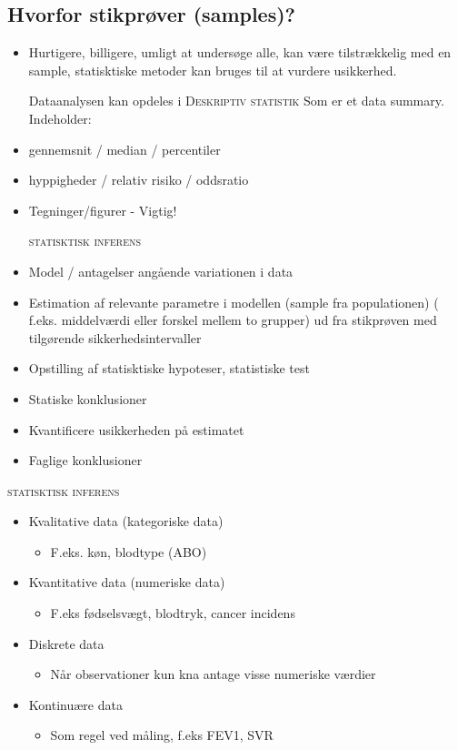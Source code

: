 \documentclass[12pt, letterpaper]{article}
\begin{document}
\subsection{Hvorfor stikprøver (samples)?}
\begin{itemize}
\item Hurtigere, billigere, umligt at undersøge alle, kan være tilstrækkelig med en sample, statisktiske metoder kan bruges til at vurdere usikkerhed. \newline

Dataanalysen kan opdeles i \newline
\textsc {Deskriptiv statistik}
Som er et data summary. Indeholder:
\item gennemsnit / median / percentiler
\item hyppigheder / relativ risiko / oddsratio
\item Tegninger/figurer - Vigtig! \newline

\textsc{statisktisk inferens}
\item Model / antagelser angående variationen i data
\item Estimation af relevante parametre i modellen (sample fra populationen) ( f.eks. middelværdi eller forskel mellem to grupper) ud fra stikprøven med tilgørende sikkerhedsintervaller
\item Opstilling af statisktiske hypoteser, statistiske test
\item Statiske konklusioner
\item Kvantificere usikkerheden på estimatet
\item Faglige konklusioner
\end{itemize}

\textsc{statisktisk inferens}
\begin{itemize}
\item Kvalitative data (kategoriske data)
\begin{itemize}
\item F.eks. køn, blodtype (ABO)
\end{itemize}
\item Kvantitative data (numeriske data)
\begin{itemize}
\item F.eks fødselsvægt, blodtryk, cancer incidens
\end{itemize}
\item Diskrete data
\begin{itemize}
\item Når observationer kun kna antage visse numeriske værdier
\end{itemize}
\item Kontinuære data
\begin{itemize}
\item Som regel ved måling, f.eks FEV1, SVR
\end{itemize}
\end{itemize}
\end{document}
